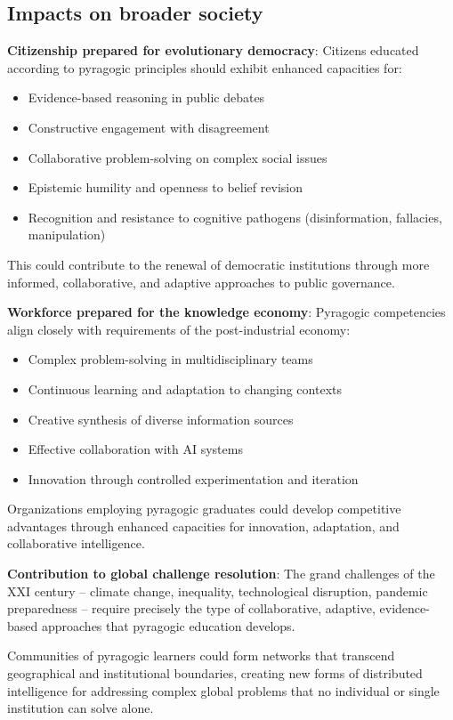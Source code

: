 \subsection{Impacts on broader society}

\textbf{Citizenship prepared for evolutionary democracy}:
Citizens educated according to pyragogic principles should exhibit enhanced capacities for:
\begin{itemize}
	\item Evidence-based reasoning in public debates
	\item Constructive engagement with disagreement
	\item Collaborative problem-solving on complex social issues
	\item Epistemic humility and openness to belief revision
	\item Recognition and resistance to cognitive pathogens (disinformation, fallacies, manipulation)
\end{itemize}

This could contribute to the renewal of democratic institutions through more informed, collaborative, and adaptive approaches to public governance.

\textbf{Workforce prepared for the knowledge economy}:
Pyragogic competencies align closely with requirements of the post-industrial economy:
\begin{itemize}
	\item Complex problem-solving in multidisciplinary teams
	\item Continuous learning and adaptation to changing contexts
	\item Creative synthesis of diverse information sources
	\item Effective collaboration with AI systems
	\item Innovation through controlled experimentation and iteration
\end{itemize}

Organizations employing pyragogic graduates could develop competitive advantages through enhanced capacities for innovation, adaptation, and collaborative intelligence.

\textbf{Contribution to global challenge resolution}:
The grand challenges of the XXI century -- climate change, inequality, technological disruption, pandemic preparedness -- require precisely the type of collaborative, adaptive, evidence-based approaches that pyragogic education develops.

Communities of pyragogic learners could form networks that transcend geographical and institutional boundaries, creating new forms of distributed intelligence for addressing complex global problems that no individual or single institution can solve alone.

